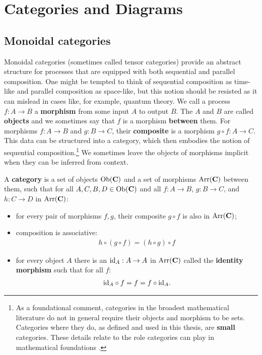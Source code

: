 \chapter{Categories and Diagrams}
\label{chap:cats}

\section{Monoidal categories}
Monoidal categories (sometimes called tensor categories) provide an abstract structure for processes that are equipped with both sequential and parallel composition. One might be tempted to think of sequential composition as time-like and parallel composition as space-like, but this notion should be resisted as it can mislead in cases like, for example, quantum theory.  We call a process $f:A\to B$ a \textbf{morphism} from some input $A$ to output $B$. The $A$ and $B$ are called \textbf{objects} and we sometimes say that $f$ is a morphism \textbf{between} them. For morphisms $f:A\to B$ and $g:B\to C$, their \textbf{composite} is a morphism $g\circ f:A\to C$. This data can be structured into a category, which then embodies the notion of sequential composition.\footnote{As a foundational comment, categories in the broadest mathematical literature do not in general require their objects and morphism to be sets. Categories where they do, as defined and used in this thesis, are \textbf{small} categories. These details relate to the role categories can play in mathematical foundations \cite{mac1969one}.} We sometimes leave the objects of morphisms implicit when they can be inferred from context.

\begin{defn}
A \textbf{category}  is a set of objects $\mbox{Ob}(\mathbf{C})$ and a set of morphisms $\mbox{Arr}(\mathbf{C})$ between them, such that for all $A,C,B,D\in \mbox{Ob}(\mathbf{C})$ and all $f:A\to B$, $g:B\to C$, and $h:C\to D$ in $\mbox{Arr}(\mathbf{C})$:
\begin{itemize}
\item for every pair of morphisms $f,g$, their composite $g\circ f$ is also in $\mbox{Arr}(\mathbf{C})$;
\item composition is associative:
\begin{align}
h\circ(g\circ f) = (h\circ g)\circ f
\end{align}
\item for every object $A$ there is an $\mbox{id}_{A}:A\to A$ in $\mbox{Arr}(\mathbf{C})$ called the \textbf{identity morphism} such that for all $f$:
\begin{align}
\mbox{id}_{A}\circ f = f = f\circ\mbox{id}_{A}.
\end{align}
\end{itemize}
\end{defn}

